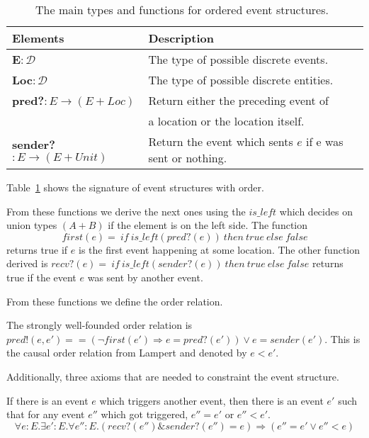 \begin{table}[h]
  \centering
  \begin{tabular}{l|l}
    Elements & Description\\\hline
    \textbf{E}$:\mathcal{D}$ & The type of possible discrete events.\\
    \textbf{Loc}$:\mathcal{D}$ & The type of possible discrete entities.\\
    \textbf{pred?}$:E\rightarrow (E+Loc)$
             & Return either the preceding event of\\
             & a location or the location itself.\\
    \textbf{sender?}$:E\rightarrow (E+Unit)$
             & Return the event which sents $e$ if e was sent or nothing.\\
  \end{tabular}
  \caption{The main types and functions for ordered event structures.~\cite{bickford2005causal}}
  \label{tab:eorder}
\end{table}

Table~\ref{tab:eorder} shows the signature of event structures with order.

From these functions we derive the next ones using the $is\_left$ which decides
on union types $(A+B)$ if the element is on the left side.
The function \[first(e)=\ if\ is\_left(pred?(e))\ then\ true\ else\ false\]
returns true if $e$ is the first event happening at some location.
The other function derived is $recv?(e)=\ if\ is\_left(sender?(e))\ then\ true\
else\ false$ returns true if the event $e$ was sent by another event.~\cite{bickford2005causal}

From these functions we define the order relation.

\begin{defi}
  The strongly well-founded order relation is
  $pred!(e,e') == (\neg first(e') \Rightarrow e = pred?(e')) \vee e = sender(e')$.
  This is the causal order relation from Lampert and denoted by $e<e'$.
\end{defi}

Additionally, three axioms that are needed to constraint the
event structure.~\cite{bickford2005causal}

\begin{axiom}
  If there is an event $e$ which triggers another event, then there is an
  event $e'$ such that for any event $e''$ which got triggered, $e''=e'$
  or $e''<e'$.
  \[\forall e:E.\exists e':E.\forall e'':E.(recv?(e'')\&sender?(e'')=e)\Rightarrow (e''=e'\vee e''<e)\]
\end{axiom}

